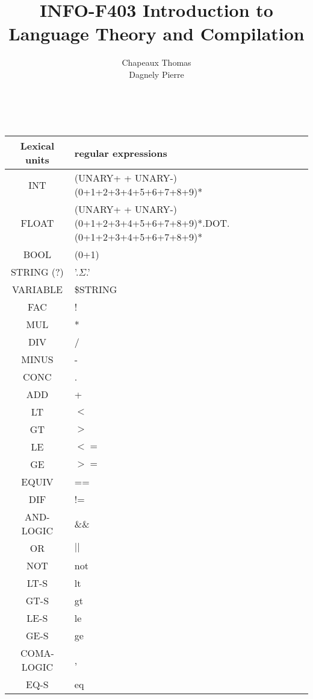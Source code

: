 \documentclass[a4paper,10pt]{article}
\title{INFO-F403 Introduction to Language Theory and Compilation}
\author{Chapeaux Thomas\\Dagnely Pierre}
\begin{document}
\maketitle


\pagebreak

~\\
\hspace{-2.5cm}\begin{longtable}{|c|l|}
\hline
Lexical units  		& regular expressions \\ \hline
INT					& (UNARY+ + UNARY-)(0+1+2+3+4+5+6+7+8+9)* \\ \hline
FLOAT				& (UNARY+ + UNARY-)(0+1+2+3+4+5+6+7+8+9)*.DOT.(0+1+2+3+4+5+6+7+8+9)* \\ \hline
BOOL				& (0+1) \\ \hline
STRING (?)			& '.$\Sigma$.'  \\ \hline
VARIABLE			& \$STRING \\ \hline
FAC					& ! \\ \hline
MUL					& * \\ \hline
DIV					& / \\ \hline
MINUS				& - \\ \hline
CONC				& . \\ \hline
ADD					& + \\ \hline
LT					& $<$ \\ \hline
GT					& $>$ \\ \hline
LE					& $<=$ \\ \hline
GE					& $>=$ \\ \hline
EQUIV				& == \\ \hline
DIF					& != \\ \hline
AND-LOGIC			& \&\& \\ \hline
OR					& $||$ \\ \hline
NOT					& not \\ \hline
LT-S				& lt \\ \hline
GT-S				& gt \\ \hline
LE-S				& le \\ \hline
GE-S				& ge \\ \hline
COMA-LOGIC			& , \\ \hline
EQ-S				& eq \\ \hline 

\end{longtable}
\end{document}
